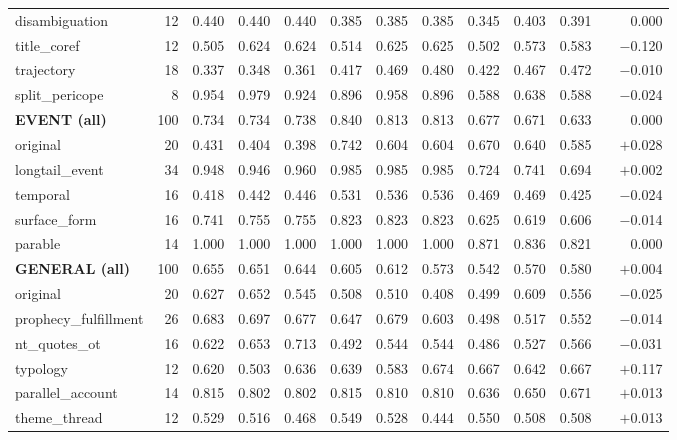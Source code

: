\begin{table}[!t]
\begin{threeparttable}
\begin{tabular}{@{}lrccccccccccr@{}}
\quad disambiguation & 12 & 0.440 & 0.440 & 0.440 & 0.385 & 0.385 & 0.385 & 0.345 & 0.403 & 0.391 & & 0.000 \\
\quad title\_coref & 12 & 0.505 & 0.624 & 0.624 & 0.514 & 0.625 & 0.625 & 0.502 & 0.573 & 0.583 & & $-$0.120 \\
\quad trajectory & 18 & 0.337 & 0.348 & 0.361 & 0.417 & 0.469 & 0.480 & 0.422 & 0.467 & 0.472 & & $-$0.010 \\
\quad split\_pericope & 8 & 0.954 & 0.979 & 0.924 & 0.896 & 0.958 & 0.896 & 0.588 & 0.638 & 0.588 & & $-$0.024 \\
\midrule
\textbf{EVENT (all)} & 100 & 0.734 & 0.734 & 0.738 & 0.840 & 0.813 & 0.813 & 0.677 & 0.671 & 0.633 & & 0.000 \\
\quad original & 20 & 0.431 & 0.404 & 0.398 & 0.742 & 0.604 & 0.604 & 0.670 & 0.640 & 0.585 & & $+$0.028 \\
\quad longtail\_event & 34 & 0.948 & 0.946 & 0.960 & 0.985 & 0.985 & 0.985 & 0.724 & 0.741 & 0.694 & & $+$0.002 \\
\quad temporal & 16 & 0.418 & 0.442 & 0.446 & 0.531 & 0.536 & 0.536 & 0.469 & 0.469 & 0.425 & & $-$0.024 \\
\quad surface\_form & 16 & 0.741 & 0.755 & 0.755 & 0.823 & 0.823 & 0.823 & 0.625 & 0.619 & 0.606 & & $-$0.014 \\
\quad parable & 14 & 1.000 & 1.000 & 1.000 & 1.000 & 1.000 & 1.000 & 0.871 & 0.836 & 0.821 & & 0.000 \\
\midrule
\textbf{GENERAL (all)} & 100 & 0.655 & 0.651 & 0.644 & 0.605 & 0.612 & 0.573 & 0.542 & 0.570 & 0.580 & & $+$0.004 \\
\quad original & 20 & 0.627 & 0.652 & 0.545 & 0.508 & 0.510 & 0.408 & 0.499 & 0.609 & 0.556 & & $-$0.025 \\
\quad prophecy\_fulfillment & 26 & 0.683 & 0.697 & 0.677 & 0.647 & 0.679 & 0.603 & 0.498 & 0.517 & 0.552 & & $-$0.014 \\
\quad nt\_quotes\_ot & 16 & 0.622 & 0.653 & 0.713 & 0.492 & 0.544 & 0.544 & 0.486 & 0.527 & 0.566 & & $-$0.031 \\
\quad typology & 12 & 0.620 & 0.503 & 0.636 & 0.639 & 0.583 & 0.674 & 0.667 & 0.642 & 0.667 & & $+$0.117 \\
\quad parallel\_account & 14 & 0.815 & 0.802 & 0.802 & 0.815 & 0.810 & 0.810 & 0.636 & 0.650 & 0.671 & & $+$0.013 \\
\quad theme\_thread & 12 & 0.529 & 0.516 & 0.468 & 0.549 & 0.528 & 0.444 & 0.550 & 0.508 & 0.508 & & $+$0.013 \\

\end{tabular}
\end{threeparttable}
\end{table}
